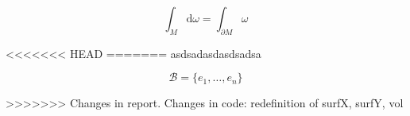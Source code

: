 \documentclass[a4paper, 11pt]{report}
\begin{document}

\shipout\null

\tableofcontents
\clearpage  
\clearpage  
\clearpage  
\clearpage  

\[
    \int_M \mathrm{d}\omega = \int_{\partial M} \omega
\]

<<<<<<< HEAD
=======
asdsadasdasdsadsa

\[
    \mathcal{B} = \{ e_1, \ldots, e_n \}   
\]

>>>>>>> Changes in report. Changes in code: redefinition of surfX, surfY, vol
\printbibliography
\end{document}
